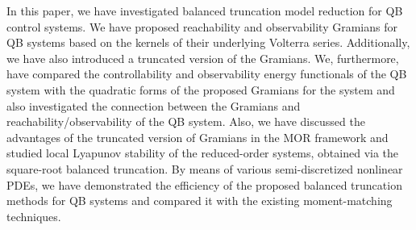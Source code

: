 In this paper, we have investigated balanced truncation model reduction for  QB control systems. We have proposed reachability and observability Gramians for QB systems based on the kernels of their underlying Volterra series.  Additionally, we have also introduced a truncated version of the Gramians. We, furthermore, have compared the controllability and observability energy functionals of the QB system with the quadratic forms of the proposed Gramians for the system and also investigated the connection between the Gramians and reachability/observability of the QB system. Also, we have discussed the advantages of the truncated version of Gramians in the MOR framework and  studied local Lyapunov stability of the reduced-order systems, obtained via the square-root balanced truncation. By means of various semi-discretized nonlinear PDEs, we have demonstrated the efficiency of the proposed balanced truncation methods for QB systems and compared it with the existing moment-matching techniques.